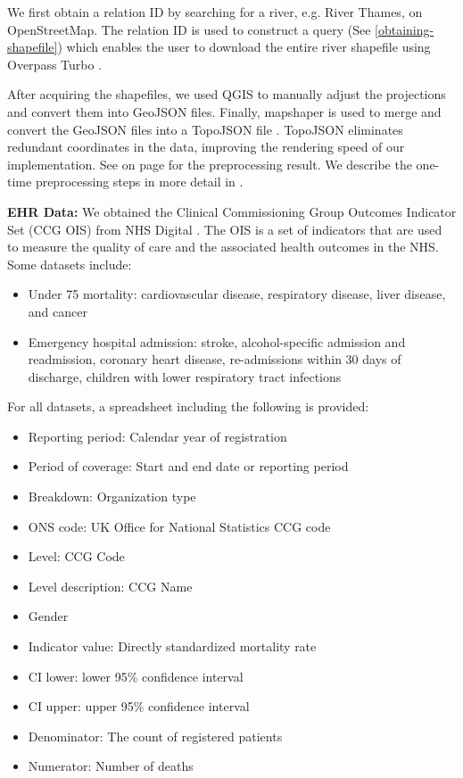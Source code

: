 \documentclass[Afour,sagev,times]{sagej}
\newcommand{\bobgraph}[1]{\noindent\textbf{#1}}
\begin{document}
We first obtain a relation ID by searching for a river, e.g. River Thames, on OpenStreetMap. The relation ID is used to construct a query (See \cref{obtaining-shapefile}) which enables the user to download the entire river shapefile using Overpass Turbo \cite{overpassturboOverpass}.

After acquiring the shapefiles, we used QGIS \cite{qgisWelcome} to manually adjust the projections and convert them into GeoJSON files. Finally, mapshaper \cite{blochMapshaper} is used to merge and convert the GeoJSON files into a TopoJSON file \cite{TopoJSON}. TopoJSON eliminates redundant coordinates in the data, improving the rendering speed of our implementation. See  on page \pageref{table:pre-processing_result} for the preprocessing result. We describe the one-time preprocessing steps in more detail in .

\bobgraph{EHR Data: }We obtained the Clinical Commissioning Group Outcomes Indicator Set (CCG OIS) from NHS Digital \cite{nhsdigitalClinical}. The OIS is a set of indicators that are used to measure the quality of care and the associated health outcomes in the NHS. Some datasets include:
\begin{itemize}
    \setlength\itemsep{0px}
    \item Under 75 mortality: cardiovascular disease, respiratory disease, liver disease, and cancer
    \item Emergency hospital admission: stroke, alcohol-specific admission and readmission, coronary heart disease, re-admissions within 30 days of discharge, children with lower respiratory tract infections
\end{itemize}

For all datasets, a spreadsheet including the following is provided:

\begin{itemize}
    \setlength\itemsep{0px}
    \item Reporting period: Calendar year of registration
    \item Period of coverage: Start and end date or reporting period
    \item Breakdown: Organization type
    \item ONS code: UK Office for National Statistics CCG code
    \item Level: CCG Code
    \item Level description: CCG Name
    \item Gender
    \item Indicator value: Directly standardized mortality rate
    \item CI lower: lower 95\% confidence interval
    \item CI upper: upper 95\% confidence interval
    \item Denominator: The count of registered patients
    \item Numerator: Number of deaths
\end{itemize}
\end{document}
